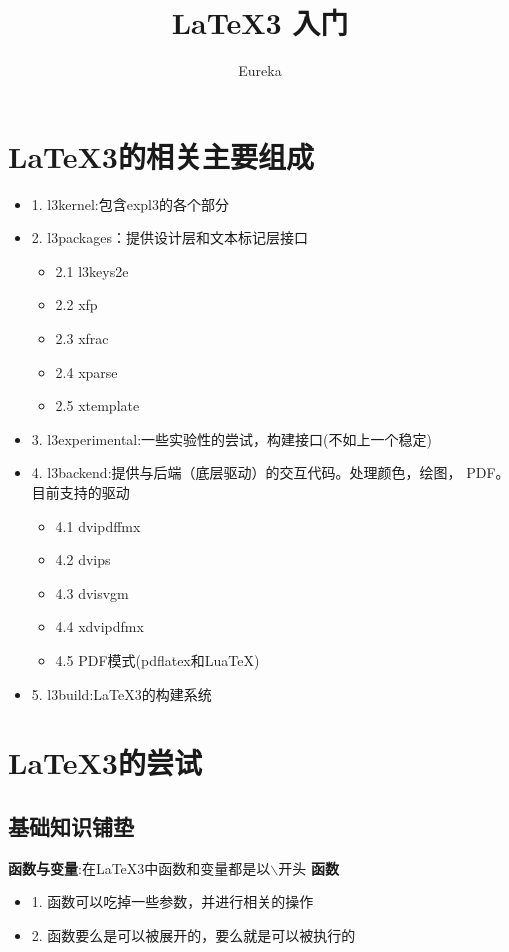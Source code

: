 \documentclass[fontset=windows]{article}
\title{\LaTeX 3 入门}
\author{Eureka}
\date{}
\begin{document}
\maketitle
\tableofcontents
\newpage

\section{\LaTeX3的相关主要组成}
\begin{itemize}
    \item 1. l3kernel:包含expl3的各个部分
    \item 2. l3packages：提供设计层和文本标记层接口
    \begin{itemize}
        \item 2.1 l3keys2e
        \item 2.2 xfp
        \item 2.3 xfrac
        \item 2.4 xparse
        \item 2.5 xtemplate
    \end{itemize}
    \item 3. l3experimental:一些实验性的尝试，构建接口(不如上一个稳定)
    \item 4. l3backend:提供与后端（底层驱动）的交互代码。处理颜色，绘图， PDF。目前支持的驱动
    \begin{itemize}
        \item 4.1 dvipdffmx
        \item 4.2 dvips
        \item 4.3 dvisvgm
        \item 4.4 xdvipdfmx
        \item 4.5 PDF模式(pdflatex和LuaTeX)
    \end{itemize}
    \item 5. l3build:\LaTeX3的构建系统
\end{itemize}

\section{\LaTeX3的尝试}
\subsection{基础知识铺垫}
\textbf{函数与变量}:在\LaTeX3中函数和变量都是以$\backslash{}$开头
\textbf{函数}
\begin{itemize}
    \item 1. 函数可以吃掉一些参数，并进行相关的操作
    \item 2. 函数要么是可以被展开的，要么就是可以被执行的
\end{itemize}
\end{document}
